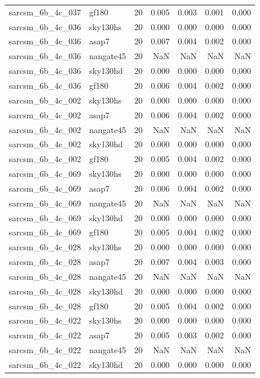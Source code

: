 \begin{tabular}{llrrrrr}
sarcsm\_6b\_4c\_037 & gf180 & 20 & 0.005 & 0.003 & 0.001 & 0.000 \\
sarcsm\_6b\_4c\_036 & sky130hs & 20 & 0.000 & 0.000 & 0.000 & 0.000 \\
sarcsm\_6b\_4c\_036 & asap7 & 20 & 0.007 & 0.004 & 0.002 & 0.000 \\
sarcsm\_6b\_4c\_036 & nangate45 & 20 & NaN & NaN & NaN & NaN \\
sarcsm\_6b\_4c\_036 & sky130hd & 20 & 0.000 & 0.000 & 0.000 & 0.000 \\
sarcsm\_6b\_4c\_036 & gf180 & 20 & 0.006 & 0.004 & 0.002 & 0.000 \\
sarcsm\_6b\_4c\_002 & sky130hs & 20 & 0.000 & 0.000 & 0.000 & 0.000 \\
sarcsm\_6b\_4c\_002 & asap7 & 20 & 0.006 & 0.004 & 0.002 & 0.000 \\
sarcsm\_6b\_4c\_002 & nangate45 & 20 & NaN & NaN & NaN & NaN \\
sarcsm\_6b\_4c\_002 & sky130hd & 20 & 0.000 & 0.000 & 0.000 & 0.000 \\
sarcsm\_6b\_4c\_002 & gf180 & 20 & 0.005 & 0.004 & 0.002 & 0.000 \\
sarcsm\_6b\_4c\_069 & sky130hs & 20 & 0.000 & 0.000 & 0.000 & 0.000 \\
sarcsm\_6b\_4c\_069 & asap7 & 20 & 0.006 & 0.004 & 0.002 & 0.000 \\
sarcsm\_6b\_4c\_069 & nangate45 & 20 & NaN & NaN & NaN & NaN \\
sarcsm\_6b\_4c\_069 & sky130hd & 20 & 0.000 & 0.000 & 0.000 & 0.000 \\
sarcsm\_6b\_4c\_069 & gf180 & 20 & 0.005 & 0.004 & 0.002 & 0.000 \\
sarcsm\_6b\_4c\_028 & sky130hs & 20 & 0.000 & 0.000 & 0.000 & 0.000 \\
sarcsm\_6b\_4c\_028 & asap7 & 20 & 0.007 & 0.004 & 0.003 & 0.000 \\
sarcsm\_6b\_4c\_028 & nangate45 & 20 & NaN & NaN & NaN & NaN \\
sarcsm\_6b\_4c\_028 & sky130hd & 20 & 0.000 & 0.000 & 0.000 & 0.000 \\
sarcsm\_6b\_4c\_028 & gf180 & 20 & 0.005 & 0.004 & 0.002 & 0.000 \\
sarcsm\_6b\_4c\_022 & sky130hs & 20 & 0.000 & 0.000 & 0.000 & 0.000 \\
sarcsm\_6b\_4c\_022 & asap7 & 20 & 0.005 & 0.003 & 0.002 & 0.000 \\
sarcsm\_6b\_4c\_022 & nangate45 & 20 & NaN & NaN & NaN & NaN \\
sarcsm\_6b\_4c\_022 & sky130hd & 20 & 0.000 & 0.000 & 0.000 & 0.000 \\

\end{tabular}
